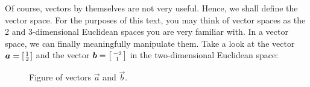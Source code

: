 Of course, vectors by themselves are not very useful. Hence, we shall define the vector space. For the purposes of this text, you may think of vector spaces as the 2 and 3-dimensional Euclidean spaces you are very familiar with. In a vector space, we can finally meaningfully manipulate them. Take a look at the vector \( \vec{a}=
\begin{bsmallmatrix}
  1 \\
  2
\end{bsmallmatrix}
\) and the vector \( \vec{b}=
\begin{bsmallmatrix}
  -2 \\
  1
\end{bsmallmatrix}
\) in the two-dimensional Euclidean space:
\begin{figure}[h]
  \centering
  \caption{Figure of vectors \(\vec{a}\) and \(\vec{b}\).}
  \label{vecab}
\end{figure}


